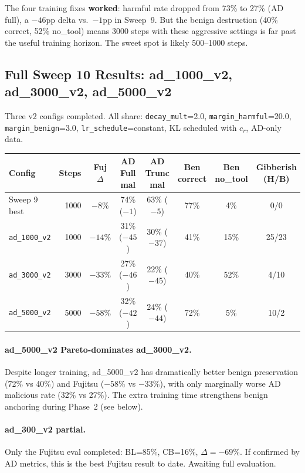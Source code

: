 \documentclass[11pt]{article}
\newcommand{\good}[1]{\textcolor{good}{#1}}
\newcommand{\bad}[1]{\textcolor{bad}{#1}}
\begin{document}
The four training fixes \textbf{worked}: harmful rate dropped from 73\% to 27\%
(AD full), a $-46$pp delta vs.\ $-1$pp in Sweep~9. But the benign destruction
(40\% correct, 52\% no\_tool) means 3000 steps with these aggressive settings
is far past the useful training horizon. The sweet spot is likely 500--1000 steps.

\subsection{Full Sweep 10 Results: ad\_1000\_v2, ad\_3000\_v2, ad\_5000\_v2}

Three v2 configs completed. All share: \texttt{decay\_mult}=2.0,
\texttt{margin\_harmful}=20.0, \texttt{margin\_benign}=3.0,
\texttt{lr\_schedule}=constant, KL scheduled with $c_r$, AD-only data.

\begin{center}
\small
\begin{tabular}{l r c c c c c c}
\toprule
Config & Steps & Fuj $\Delta$ & AD Full mal & AD Trunc mal & Ben correct & Ben no\_tool & Gibberish (H/B) \\
\midrule
Sweep 9 best     & 1000 & $-8\%$  & 74\% ($-1$) & 63\% ($-5$) & 77\% & 4\%  & 0/0 \\
\texttt{ad\_1000\_v2} & 1000 & $-14\%$ & 31\% (\good{$-45$}) & 30\% (\good{$-37$}) & 41\% & 15\% & 25/23 \\
\texttt{ad\_3000\_v2} & 3000 & $-33\%$ & 27\% (\good{$-46$}) & 22\% (\good{$-45$}) & \bad{40\%} & \bad{52\%} & 4/10 \\
\texttt{ad\_5000\_v2} & 5000 & \good{$-58\%$} & 32\% (\good{$-42$}) & 24\% (\good{$-44$}) & \good{72\%} & 5\% & 10/2 \\
\bottomrule
\end{tabular}
\end{center}

\paragraph{ad\_5000\_v2 Pareto-dominates ad\_3000\_v2.}
Despite longer training, ad\_5000\_v2 has dramatically better benign preservation
(72\% vs 40\%) and Fujitsu ($-58\%$ vs $-33\%$), with only marginally worse AD
malicious rate (32\% vs 27\%). The extra training time strengthens benign
anchoring during Phase~2 (see below).

\paragraph{ad\_300\_v2 partial.} Only the Fujitsu eval completed: BL=85\%,
CB=16\%, $\Delta=-69\%$. If confirmed by AD metrics, this is the best Fujitsu
result to date. Awaiting full evaluation.
\end{document}
